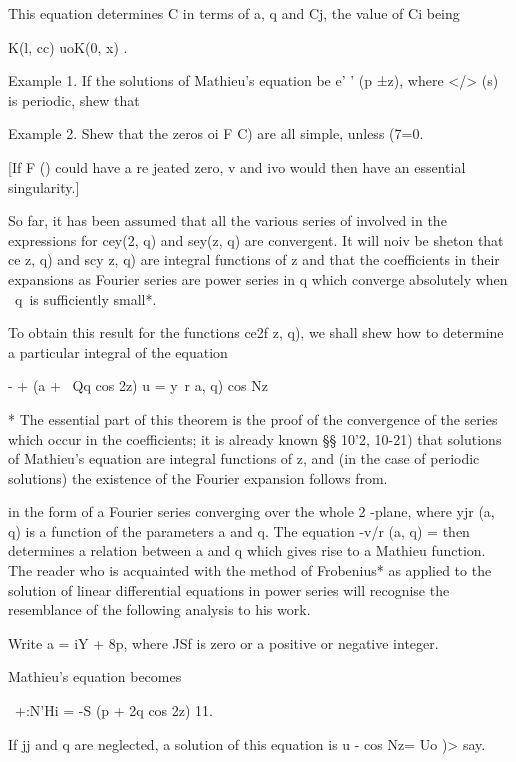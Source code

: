 This equation determines C in terms of a, q and Cj, the value of Ci
being

K(l, cc) uoK(0, x) .

Example 1. If the solutions of Mathieu's equation be e' ' (p ±z),
where </> (s) is periodic, shew that

Example 2. Shew that the zeros oi F C) are all simple, unless (7=0.


[If F () could have a re jeated zero, v and ivo would then have an
essential singularity.]


So far, it has been assumed that all the various series of
involved in the expressions for cey(2, q) and sey(z, q) are
convergent. It will noiv be sheton that ce z, q) and scy z, q) are
integral functions of z and that the coefficients in their expansions
as Fourier series are power series in q which converge absolutely when
\ q\ is sufficiently small*.

To obtain this result for the functions ce2f z, q), we shall shew how
to determine a particular integral of the equation

- + (a + \ Qq cos 2z) u = y\ r a, q) cos Nz

* The essential part of this theorem is the proof of the convergence
of the series which occur in the coefficients; it is already known §§
10'2, 10-21) that solutions of Mathieu's equation are integral
functions of z, and (in the case of periodic solutions) the existence
of the Fourier expansion follows from.

%
%

in the form of a Fourier series converging over the whole 2 -plane,
where yjr (a, q) is a function of the parameters a and q. The equation
-v/r (a, q) = then determines a relation between a and q which gives
rise to a Mathieu function. The reader who is acquainted with the
method of Frobenius* as applied to the solution of linear differential
equations in power series will recognise the resemblance of the
following analysis to his work.

Write a = iY + 8p, where JSf is zero or a positive or negative
integer.

Mathieu's equation becomes

 \ +:N'Hi = -S (p + 2q cos 2z) 11.

If jj and q are neglected, a solution of this equation is u - cos Nz=
Uo )> say.

